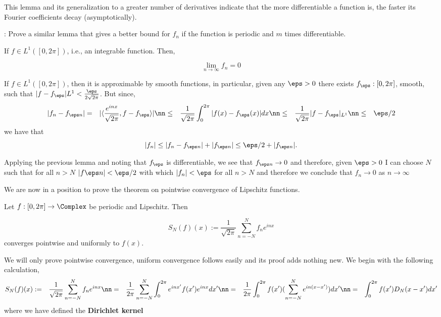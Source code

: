 This lemma and its generalization to a greater number of derivatives indicate that the more differentiable a function is, 
the faster its Fourier coefficients decay (asymptotically).

\ejer: Prove a similar lemma that gives a better bound for $f_n$ if the function is periodic and $m$ times differentiable.

If $f \in L^1([0,2\pi])$, i.e., an integrable function. Then,

\begin{equation} 
  \label{eq:R_L} \lim_{n \to \infty} f_n = 0 
\end{equation} \elem

\bpru 
If $f\in L^1([0,2\pi])$, then it is approximable by smooth functions, in particular, given any $\eps >0$ 
there exists $f_{\eps}:[0,2\pi]$, smooth, such that $|f-f_{\eps}|{L^1} < \frac{\eps}{2\sqrt{2\pi}}$. 
But since, 
\begin{eqnarray} 
  |f_n - f_{\eps n}| &=& |\langle \frac{e^{inx}}{\sqrt{2\pi}},f - f_{\eps} \rangle | \nn 
  &\leq& \frac{1}{\sqrt{2\pi}} \int_0^{2\pi}|f(x) - f_{\eps}(x)|dx \nn 
  &\leq& \frac{1}{\sqrt{2\pi}}|f-f_{\eps}|_{L^1} \nn 
  &\leq& \eps/2 
\end{eqnarray} 
% 
we have that 
\begin{equation} 
  |f_n| \leq |f_n - f_{\eps n}| + |f_{\eps n}| \leq \eps/2 + |f_{\eps n}|. 
\end{equation} 

Applying the previous lemma and noting that $f_{\eps}$ is differentiable, we see that $f_{\eps n} \to 0$ 
and therefore, given $\eps >0$ I can choose $N$ such that for all $n>N$ $|f{\eps n}| < \eps/2$ with 
which $|f_n| < \eps$ for all $n>N$ and therefore we conclude that $f_n \to 0$ as $n \to \infty$ 
\epru

We are now in a position to prove the theorem on pointwise convergence of Lipschitz functions.

\bteo 
Let $f:[0,2\pi] \to \Complex$ be periodic and Lipschitz. Then

\begin{equation} 
  S_N(f)(x) := \frac{1}{\sqrt{2\pi}}\sum_{n=-N}^{N} f_n e^{inx}
\end{equation} 
converges pointwise and uniformly to $f(x)$. 
\eteo

\bpru 
We will only prove pointwise convergence, uniform convergence follows easily and its proof adds nothing new. We begin with the following calculation, 
\begin{eqnarray} 
  S_N(f)(x) &:=& \frac{1}{\sqrt{2\pi}}\sum_{n=-N}^{N} f_n e^{inx} \nn 
  &=& \frac{1}{{2\pi}}\sum_{n=-N}^{N} \int_0^{2\pi}e^{inx'}f(x') e^{inx}dx' \nn 
  &=& \frac{1}{{2\pi}}\int_0^{2\pi}f(x') (\sum_{n=-N}^{N}e^{in(x-x')})dx' \nn 
  &=& \int_0^{2\pi}f(x')D_N(x-x')dx'
\end{eqnarray} 
where we have defined the \textbf{Dirichlet kernel}~ 

